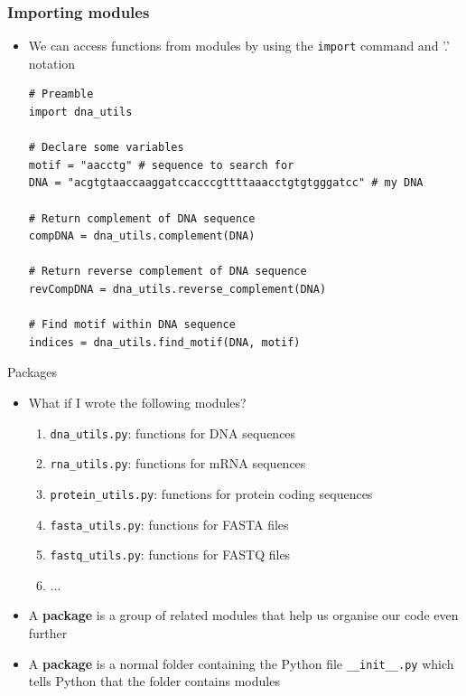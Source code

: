\documentclass[pdf]{beamer}
\begin{document}
\begin{frame}[fragile]
\frametitle{Importing modules}

\begin{itemize}\addtolength{\itemsep}{\baselineskip}

	\item We can access functions from modules by using the \texttt{import} command
	and '.' notation

\begin{lstlisting}[style=python]
# Preamble
import dna_utils

# Declare some variables
motif = "aacctg" # sequence to search for
DNA = "acgtgtaaccaaggatccacccgttttaaacctgtgtgggatcc" # my DNA

# Return complement of DNA sequence
compDNA = dna_utils.complement(DNA)

# Return reverse complement of DNA sequence
revCompDNA = dna_utils.reverse_complement(DNA)

# Find motif within DNA sequence 
indices = dna_utils.find_motif(DNA, motif)
\end{lstlisting}

\end{itemize}

\end{frame}

\begin{frame}{Packages}

\begin{itemize}\addtolength{\itemsep}{\baselineskip}
	\item<1-> What if I wrote the following modules?
	\begin{enumerate}
		\item<2-> \texttt{dna\_utils.py}: {\scriptsize functions for DNA sequences}
		\item<3-> \texttt{rna\_utils.py}: {\scriptsize functions for mRNA sequences}
		\item<4-> \texttt{protein\_utils.py}: {\scriptsize functions for protein coding sequences}
		\item<5-> \texttt{fasta\_utils.py}: {\scriptsize functions for FASTA files}
		\item<6-> \texttt{fastq\_utils.py}: {\scriptsize functions for FASTQ files}
		\item<6-> ...
	\end{enumerate}

	\item<7-> A \textbf{package} is a group of related modules that help us organise our code
	even further

	\item<8-> A \textbf{package} is a normal folder containing the Python file \texttt{\_\_init\_\_.py} 
	which tells Python that the folder contains modules  
\end{itemize}

\end{frame}
\end{document}

